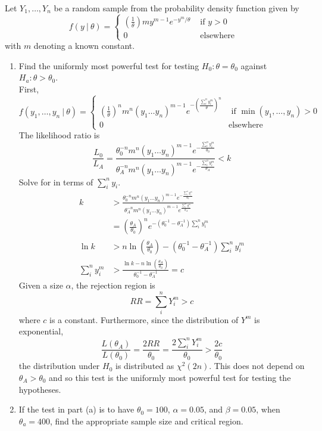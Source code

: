 \documentclass[12pt]{article}
\newcommand{\ques}[1]{\noindent {\bf Question #1: }}
\begin{document}
\ques{10.98} Let $Y_1,\dots,Y_n$ be a random sample from the probability density function given by 
$$ f(y~|~\theta) = \begin{cases} \left( \frac{1}{\theta} \right) my^{m-1} e^{-y^m / \theta}  &\text{ if } y > 0 \\ 0 &\text{ elsewhere } \end{cases} $$ with $m$ denoting a known constant. 
\begin{enumerate} 
\item Find the uniformly most powerful test for testing $H_0: \theta = \theta_0$ against $H_a: \theta > \theta_0$. \\
First, $$ f(y_1,\dots,y_n ~|~\theta) = \begin{cases} \left(\frac{1}{\theta} \right)^n m^n (y_1\dots y_n)^{m-1} e^{-\left(\frac{\sum_i^n y_i^m}{\theta}\right)^n} &\text{ if } \min(y_1,\dots,y_n) > 0 \\ 0 &\text{elsewhere} \end{cases} $$ 
The likelihood ratio is 
$$ \frac{L_0}{L_A} = \frac{\theta_0^{-n} m^n (y_1 \dots y_n)^{m-1} e^{- \frac{\sum_i^n y_i^m}{\theta_0}}}{\theta_A^{-n} m^n (y_1 \dots y_n)^{m-1} e^{-\frac{\sum_i^n y_i^m}{\theta_A}}} < k $$ 
Solve for in terms of $\sum_i^n y_i$. 
$$ \begin{aligned} k &> \frac{\theta_0^{-n} m^n (y_1 \dots y_n)^{m-1} e^{-\frac{\sum_i^n y_i^m}{\theta_0}}}{\theta_A^{-n} m^n (y_1 \dots y_n)^{m-1} e^{\frac{\sum_i^n y_i^m}{\theta_A}}} \\ &= 
\left( \frac{\theta_A}{\theta_0} \right)^n e^{-(\theta_0^{-1} - \theta_A^{-1})\sum_i^n y_i^m} \\ \ln k &> n \ln\left( \frac{\theta_A}{\theta_0} \right) - (\theta_0^{-1} - \theta_A^{-1})\sum_i^n y_i^m \\
\sum_i^n y_i^m &> \frac{\ln k - n\ln \left( \frac{\theta_A}{\theta_0} \right)}{\theta_0^{-1} - \theta_A^{-1}} = c
 \end{aligned} $$ 
 Given a size $\alpha$, the rejection region is $$ RR = \sum_i^n Y_i^m > c $$ where $c$ is a constant. Furthermore, since the distribution of $Y^m$ is exponential, $$ \frac{L(\theta_A)}{L(\theta_0)} = \frac{2RR}{\theta_0} = \frac{2\sum_i^n Y_i^m}{\theta_0} > \frac{2c}{\theta_0} $$ the distribution under $H_0$ is distributed as $\chi^2(2n)$. This does not depend on $\theta_A > \theta_0$ and so this test is the uniformly most powerful test for testing the hypotheses. 
\item If the test in part (a) is to have $\theta_0 = 100$, $\alpha = 0.05$, and $\beta = 0.05$, when $\theta_a = 400$, find the appropriate sample size and critical region. \\

\end{enumerate}
\end{document}
